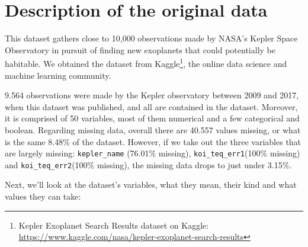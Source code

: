 
\section{Description of the original data}%
\label{sec:desc-orig}



This dataset gathers close to 10,000 observations made by NASA's 
Kepler Space Observatory in pursuit of finding new exoplanets that
could potentially be habitable. 
We obtained the dataset from Kaggle\footnote{Kepler Exoplanet Search Results 
dataset on Kaggle:
\url{https://www.kaggle.com/nasa/kepler-exoplanet-search-results}},
the online data science and machine learning community.

9.564 observations were made by the Kepler observatory between 2009 and
2017, when this dataset was published, and all are contained in the dataset.
Moreover, it is comprised of 50 variables, most of them numerical and a few
categorical and boolean. Regarding missing data, overall there are 40.557 values
missing, or what is the same 8.48\% of the dataset. However, if we take out the
three variables that are largely missing: \texttt{kepler\_name}
(76.01\% missing), \texttt{koi\_teq\_err1}(100\% missing) and 
\texttt{koi\_teq\_err2}(100\% missing), the missing data drops
to just under 3.15\%.

Next, we'll look at the dataset's variables, what they mean, their kind
and what values they can take:

\newcommand{\dd}{\textsuperscript{\ddag}}

